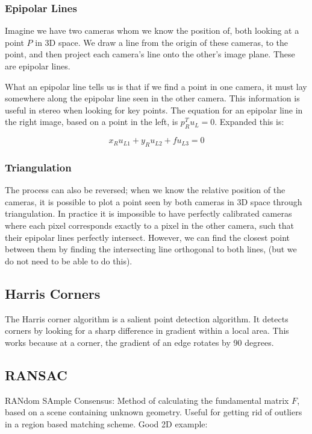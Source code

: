 \documentclass{article}
\begin{document}
        \subsubsection{Epipolar Lines}
            Imagine we have two cameras whom we know the position of, both looking at a point $P$ in 3D space. We draw a line from the origin of these cameras, to the point, and then project each camera's line onto the other's image plane. These are epipolar lines.
            
            What an epipolar line tells us is that if we find a point in one camera, it must lay somewhere along the epipolar line seen in the other camera. This information is useful in stereo when looking for key points. The equation for an epipolar line in the right image, based on a point in the left, is $p^T_Ru_L = 0$. Expanded this is:

            $$x_Ru_{L1} + y_Ru_{L2} + fu_{L3} = 0$$
            
        \subsubsection{Triangulation}
            The process can also be reversed; when we know the relative position of the cameras, it is possible to plot a point seen by both cameras in 3D space through triangulation. In practice it is impossible to have perfectly calibrated cameras where each pixel corresponds exactly to a pixel in the other camera, such that their epipolar lines perfectly intersect. However, we can find the closest point between them by finding the intersecting line orthogonal to both lines, (but we do not need to be able to do this).
            
    \subsection{Harris Corners}
    
        The Harris corner algorithm is a salient point detection algorithm. It detects corners by looking for a sharp difference in gradient within a local area. This works because at a corner, the gradient of an edge rotates by 90 degrees.
            

    \subsection{RANSAC}
        RANdom SAmple Consensus: Method of calculating the fundamental matrix $F$, based on a scene containing unknown geometry. Useful for getting rid of outliers in a region based matching scheme.
Good 2D example:
        
\end{document}
